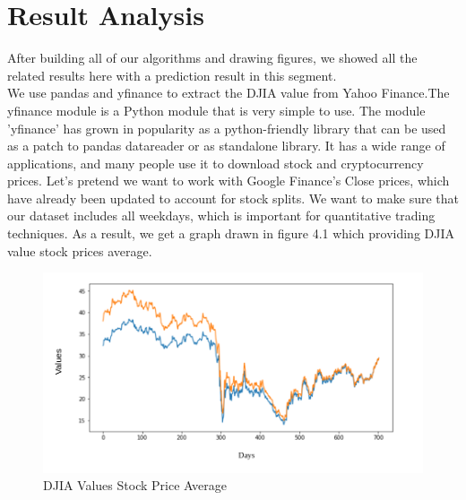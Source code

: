 \chapter{Result Analysis}
After building all of our algorithms and drawing figures, we showed all the related results here with a prediction result in this segment.\\

We use pandas and yfinance to extract the DJIA value from Yahoo Finance.The yfinance module is a Python module that is very simple to use. The module 'yfinance' has grown in popularity as a python-friendly library that can be used as a patch to pandas datareader or as standalone library.  It has a wide range of applications, and many people use it to download stock and cryptocurrency prices. Let's pretend we want to work with Google Finance's Close prices, which have already been updated to account for stock splits. We want to make sure that our dataset includes all weekdays, which is important for quantitative trading techniques. As a result, we get a graph drawn in figure 4.1 which providing DJIA value stock prices average.\\
\begin{figure}[H]
    \centering
    \includegraphics[scale=.5]{img4/DJIA Average.png}
    \caption{DJIA Values Stock Price Average}
    \label{fig:DJIA Average}
\end{figure}

